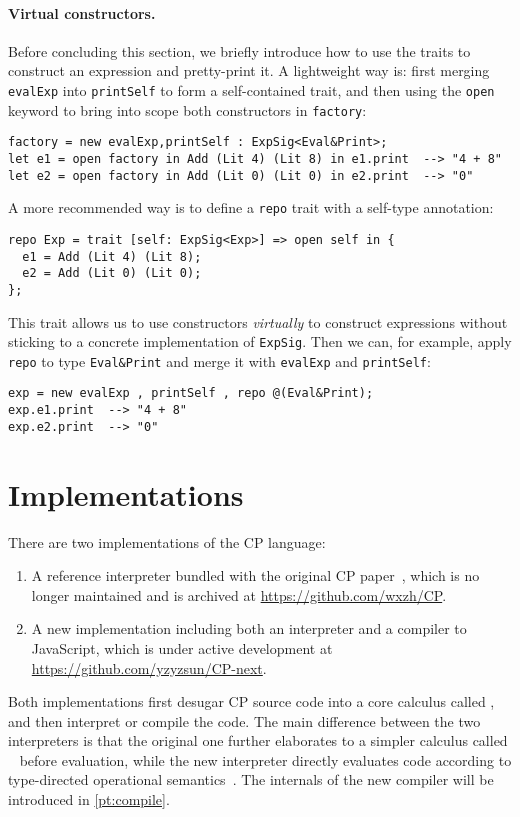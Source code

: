 \paragraph{Virtual constructors.}
Before concluding this section, we briefly introduce how to use the traits to
construct an expression and pretty-print it. A lightweight way is: first merging
\lstinline{evalExp} into \lstinline{printSelf} to form a self-contained trait,
and then using the \lstinline{open} keyword to bring into scope both
constructors in \lstinline{factory}:
\begin{lstlisting}
factory = new evalExp,printSelf : ExpSig<Eval&Print>;
let e1 = open factory in Add (Lit 4) (Lit 8) in e1.print  --> "4 + 8"
let e2 = open factory in Add (Lit 0) (Lit 0) in e2.print  --> "0"
\end{lstlisting}

A more recommended way is to define a \lstinline{repo} trait with a self-type
annotation:
\begin{lstlisting}
repo Exp = trait [self: ExpSig<Exp>] => open self in {
  e1 = Add (Lit 4) (Lit 8);
  e2 = Add (Lit 0) (Lit 0);
};
\end{lstlisting}
This trait allows us to use constructors \emph{virtually} to construct
expressions without sticking to a concrete implementation of \lstinline{ExpSig}.
Then we can, for example, apply \lstinline{repo} to type \lstinline{Eval&Print}
and merge it with \lstinline{evalExp} and \lstinline{printSelf}:
\begin{lstlisting}
exp = new evalExp , printSelf , repo @(Eval&Print);
exp.e1.print  --> "4 + 8"
exp.e2.print  --> "0"
\end{lstlisting}

\section{Implementations}

There are two implementations of the CP language:
\begin{enumerate}
\item A reference interpreter bundled with the original CP
      paper~\citep{zhang2021compositional}, which is no longer maintained and is
      archived at \url{https://github.com/wxzh/CP}.
\item A new implementation including both an interpreter and a compiler to
      JavaScript, which is under active development at
      \url{https://github.com/yzyzsun/CP-next}.
\end{enumerate}
Both implementations first desugar CP source code into a core calculus called
\fiplus, and then interpret or compile the \fiplus code. The main difference
between the two interpreters is that the original one further elaborates \fiplus
to a simpler calculus called \fco~\citep{bi2019distributive} before evaluation,
while the new interpreter directly evaluates \fiplus code according to
type-directed operational semantics~\citep{huang2021taming,fan2022direct}. The
internals of the new compiler will be introduced in \autoref{pt:compile}.
